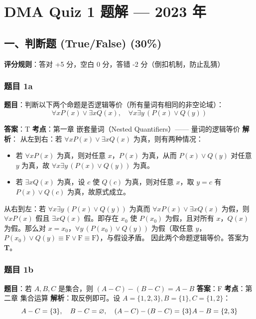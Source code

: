 \documentclass[10pt,a4paper,openany]{ctexbook}
\theoremstyle{definition}
\theoremstyle{remark}
\begin{document}
\section{DMA Quiz 1 题解 — 2023 年}

\subsection{一、判断题 (True/False) (30\%)}

\textbf{评分规则}：答对 +5 分，空白 0 分，答错 -2 分（倒扣机制，防止乱猜）
\subsubsection{题目 1a}

\textbf{题目}：判断以下两个命题是否逻辑等价（所有量词有相同的非空论域）：
\[
\forall x P(x) \lor \exists x Q(x),\quad \forall x \exists y\, (P(x) \lor Q(y))
\]

\textbf{答案}：T
\textbf{考点}：第一章 嵌套量词（Nested Quantifiers）—— 量词的逻辑等价
\textbf{解析}：
从左到右：若 $\forall x P(x) \lor \exists x Q(x)$ 为真，则有两种情况：
\begin{itemize}
\item 若 $\forall x P(x)$ 为真，则对任意 $x$，$P(x)$ 为真，从而 $P(x) \lor Q(y)$ 对任意 $y$ 为真，故 $\forall x \exists y\, (P(x) \lor Q(y))$ 为真。
\item 若 $\exists x Q(x)$ 为真，设 $c$ 使 $Q(c)$ 为真，则对任意 $x$，取 $y = c$ 有 $P(x) \lor Q(c)$ 为真，故原式成立。

\end{itemize}

从右到左：若 $\forall x \exists y\, (P(x) \lor Q(y))$ 为真而 $\forall x P(x) \lor \exists x Q(x)$ 为假，则 $\forall x P(x)$ 假且 $\exists x Q(x)$ 假。即存在 $x_0$ 使 $P(x_0)$ 为假，且对所有 $x$，$Q(x)$ 为假。那么对 $x = x_0$，$\forall y\, (P(x_0) \lor Q(y))$ 为假（取任意 $y$，$P(x_0) \lor Q(y) \equiv \mathrm{F} \lor \mathrm{F} \equiv \mathrm{F}$），与假设矛盾。
因此两个命题逻辑等价。答案为 \textbf{T}。
\vspace{-2pt}

\subsubsection{题目 1b}

\textbf{题目}：若 $A, B, C$ 是集合，则 $(A - C) - (B - C) = A - B$
\textbf{答案}：F
\textbf{考点}：第二章 集合运算
\textbf{解析}：取反例即可。设 $A = \{1, 2, 3\}, B = \{1\}, C = \{1, 2\}$：
\[
A - C = \{3\},\quad B - C = \varnothing,\quad (A - C) - (B - C) = \{3\} \\
A - B = \{2, 3\}
\]
\end{document}
